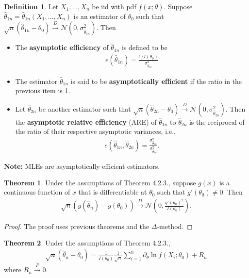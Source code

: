 \documentclass{book}
\theoremstyle{definition}
\newtheorem{defn}{Definition}[section]
\newtheorem{thm}{Theorem}[section]
\newcommand{\p}{\partial}
\newcommand{\N}{\mathcal{N}}
\newcommand{\f}[2]{\frac{#1}{#2}}
\newcommand{\lp}{\left(}
\newcommand{\rp}{\right)}
\begin{document}
\begin{defn}
	Let $X_1,\dots,X_n$ be iid with pdf $f(x;\theta)$. Suppose $\hat{\theta}_{1n} = \hat{\theta}_{1n}(X_1,\dots,X_n)$ is an estimator of $\theta_0$ such that $\sqrt{n}(\hat{\theta}_{1n} - \theta_0) \xrightarrow{D} \N(0,\sigma^2_{\hat{\theta}_{1n}})$. Then
	\begin{itemize}
		\item The \textbf{asymptotic efficiency} of $\hat{\theta}_{1n}$ is defined to be
		\begin{align}
		e(\hat\theta_{1n}) = \f{1/I(\theta_0)}{\sigma^2_{\hat\theta_{1n}}}
		\end{align}
		
		\item The estimator $\hat\theta_{1n}$ is said to be \textbf{asymptotically efficient} if the ratio in the previous item is 1. 
		
		\item Let $\hat\theta_{2n}$ be another estimator such that  $\sqrt{n}(\hat{\theta}_{2n} - \theta_0) \xrightarrow{D} \N(0,\sigma^2_{\hat{\theta}_{2n}})$. Then the \textbf{asymptotic relative efficiency} (ARE) of $\hat\theta_{1n}$ to $\hat\theta_{2n}$ is the reciprocal of the ratio of their respective asymptotic variances, i.e., 
		\begin{align}
		e(\hat\theta_{1n}, \hat\theta_{2n}) = \f{\sigma^2_{\hat\theta_{2n}}}{\sigma^2_{\hat\theta_{1n}}}.
		\end{align}
	\end{itemize}
\end{defn}



\textbf{Note:} MLEs are asymptotically efficient estimators.


\begin{thm}
	Under the assumptions of Theorem 4.2.3., suppose $g(x)$ is a continuous function of $x$ that is differentiable at $\theta_0$ such that $g'(\theta_0) \neq 0$. Then 
	\begin{align}
	\sqrt{n}(g(\hat\theta_n) - g(\theta_0)) \xrightarrow{D} \N\lp 0, \f{g'(\theta_0)^2}{I(\theta_0)} \rp.
	\end{align}
\end{thm}

\begin{proof}
	The proof uses previous theorems and the $\Delta$-method. 
\end{proof}



\begin{thm}
	Under the assumptions of Theorem 4.2.3., 
	\begin{align}
	\sqrt{n}(\hat\theta_n - \theta_0) = \f{1}{I(\theta_0)}\f{1}{\sqrt{n}}\sum^n_{i=1}\p_\theta \ln f(X_i; \theta_0) + R_n
	\end{align}
	where $R_n \xrightarrow{P} 0$. 
\end{thm}
\end{document}
